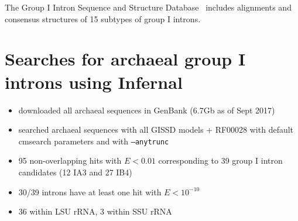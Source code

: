 \documentclass[custom,landscape,final,30pt,plainboxedsections]{sciposter-titleskipsmall}
\begin{document}
\begin{multicols}{3}

\begin{flushleft}
The Group I Intron Sequence and Structure Database~\cite{Zhou08}
includes alignments and consensus structures of 15 subtypes of group I
introns. 
\end{flushleft}

\footnotesize

\normalsize

\section*{Searches for archaeal group I introns using Infernal}

\begin{itemize}
\item downloaded all archaeal sequences in GenBank (6.7Gb as of Sept
  2017)
\item searched archaeal sequences with all GISSD models + RF00028 with
  default cmsearch parameters and with \texttt{--anytrunc}
\item 95 non-overlapping hits with $E < 0.01$
  corresponding to 39
  group I intron candidates (12 IA3 and 27 IB4)
\item 30/39 introns have at least one hit with $E < 10^{-10}$ 
\item 36 within LSU rRNA, 3 within SSU rRNA
\end{itemize}  


\end{multicols}
\end{document}
